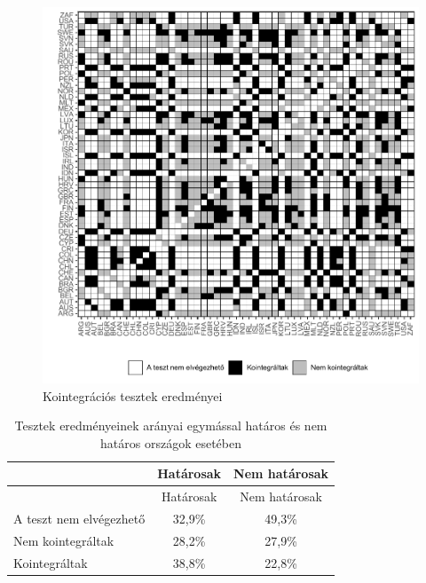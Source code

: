 \documentclass[
]{article}
\begin{document}
\begin{figure}
\centering
\includegraphics{ujdemografiaiprogram_files/figure-latex/unnamed-chunk-8-1.pdf}
\caption{Kointegrációs tesztek eredményei}
\end{figure}

\begin{longtable}[]{@{}lcc@{}}
\caption{Tesztek eredményeinek arányai egymással határos és nem határos
országok esetében}\tabularnewline
\toprule
& Határosak & Nem határosak\tabularnewline
\midrule
\endfirsthead
\toprule
& Határosak & Nem határosak\tabularnewline
\midrule
\endhead
A teszt nem elvégezhető & 32,9\% & 49,3\%\tabularnewline
Nem kointegráltak & 28,2\% & 27,9\%\tabularnewline
Kointegráltak & 38,8\% & 22,8\%\tabularnewline
\bottomrule
\end{longtable}
\end{document}

